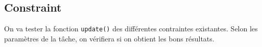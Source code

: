 


\subsection{Constraint}

On va tester la fonction \texttt{update()} des différentes contraintes existantes. Selon les paramètres de la tâche, on vérifiera si on obtient les bons résultats.

